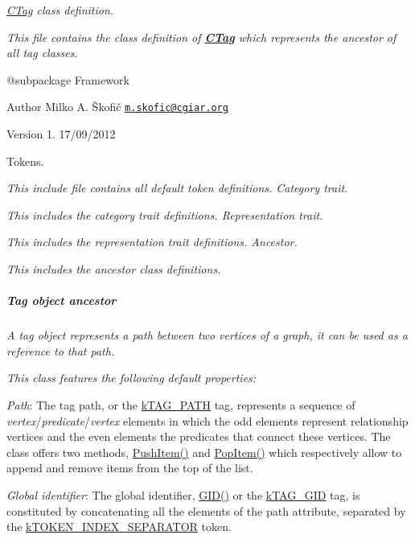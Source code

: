 {\itshape {\itshape \hyperlink{class_c_tag}{C\-Tag}} class definition.}

{\itshape This file contains the class definition of {\bfseries \hyperlink{class_c_tag}{C\-Tag}} which represents the ancestor of all tag classes.}

{\itshape \begin{DoxyVerb} @subpackage        Framework
\end{DoxyVerb}
}

{\itshape \begin{DoxyAuthor}{Author}
Milko A. Škofič \href{mailto:m.skofic@cgiar.org}{\tt m.\-skofic@cgiar.\-org} 
\end{DoxyAuthor}
\begin{DoxyVersion}{Version}
1. 17/09/2012
\end{DoxyVersion}
Tokens.}

{\itshape This include file contains all default token definitions. Category trait.}

{\itshape This includes the category trait definitions. Representation trait.}

{\itshape This includes the representation trait definitions. Ancestor.}

{\itshape This includes the ancestor class definitions. \subparagraph*{Tag object ancestor}}

{\itshape }

{\itshape A tag object represents a path between two vertices of a graph, it can be used as a reference to that path.}

{\itshape This class features the following default properties\-:}

{\itshape 
\begin{DoxyItemize}
\item {\itshape Path}\-: The tag path, or the {\ttfamily \hyperlink{}{k\-T\-A\-G\-\_\-\-P\-A\-T\-H}} tag, represents a sequence of {\itshape vertex}/{\itshape predicate}/{\itshape vertex} elements in which the odd elements represent relationship vertices and the even elements the predicates that connect these vertices. The class offers two methods, \hyperlink{}{Push\-Item()} and \hyperlink{}{Pop\-Item()} which respectively allow to append and remove items from the top of the list. 
\item {\itshape Global identifier}\-: The global identifier, {\ttfamily \hyperlink{}{G\-I\-D()}} or the {\ttfamily \hyperlink{}{k\-T\-A\-G\-\_\-\-G\-I\-D}} tag, is constituted by concatenating all the elements of the path attribute, separated by the \hyperlink{}{k\-T\-O\-K\-E\-N\-\_\-\-I\-N\-D\-E\-X\-\_\-\-S\-E\-P\-A\-R\-A\-T\-O\-R} token. 
\end{DoxyItemize}}


